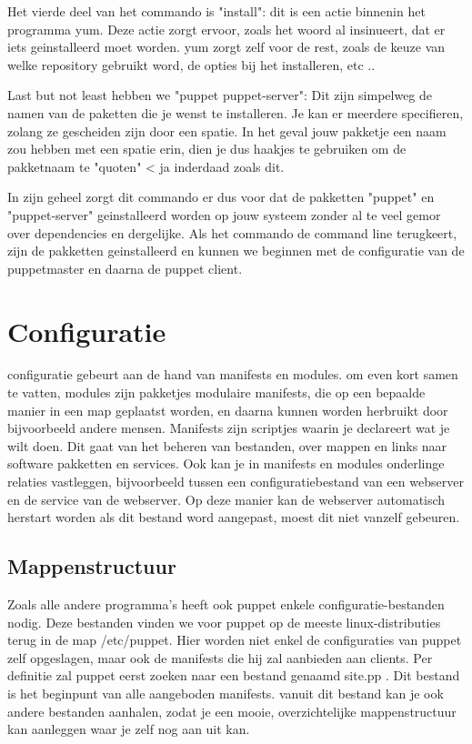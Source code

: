 Het vierde deel van het commando is "install": dit is een actie binnenin het programma yum. Deze actie zorgt ervoor, zoals het woord al insinueert, dat er iets geinstalleerd moet worden. yum zorgt zelf voor de rest, zoals de keuze van welke repository gebruikt word, de opties bij het installeren, etc ..

Last but not least hebben we "puppet puppet-server": Dit zijn simpelweg de namen van de paketten die je wenst te installeren. Je kan er meerdere specifieren, zolang ze gescheiden zijn door een spatie. In het geval jouw pakketje een naam zou hebben met een spatie erin, dien je dus haakjes te gebruiken om de pakketnaam te "quoten" < ja inderdaad zoals dit.

In zijn geheel zorgt dit commando er dus voor dat de pakketten "puppet" en "puppet-server" geinstalleerd worden op jouw systeem zonder al te veel gemor over dependencies en dergelijke. Als het commando de command line terugkeert, zijn de pakketten geinstalleerd en kunnen we beginnen met de configuratie van de puppetmaster en daarna de puppet client.


\section{Configuratie}
configuratie gebeurt aan de hand van manifests en modules. om even kort samen te vatten, modules zijn pakketjes modulaire manifests, die op een bepaalde manier in een map geplaatst worden, en daarna kunnen worden herbruikt door bijvoorbeeld andere mensen. Manifests zijn scriptjes waarin je declareert wat je wilt doen. Dit gaat van het beheren van bestanden, over mappen en links naar software pakketten en services.
Ook kan je in manifests en modules onderlinge relaties vastleggen, bijvoorbeeld tussen een configuratiebestand van een webserver en de service van de webserver. Op deze manier kan de webserver automatisch herstart worden als dit bestand word aangepast, moest dit niet vanzelf gebeuren.

\subsection{Mappenstructuur}
Zoals alle andere programma's heeft ook puppet enkele configuratie-bestanden nodig. Deze bestanden vinden we voor puppet op de meeste linux-distributies terug in de map /etc/puppet. Hier worden niet enkel de configuraties van puppet zelf opgeslagen, maar ook de manifests die hij zal aanbieden aan clients. Per definitie zal puppet eerst zoeken naar een bestand genaamd site.pp . Dit bestand is het beginpunt van alle aangeboden manifests. vanuit dit bestand kan je ook andere bestanden aanhalen, zodat je een mooie, overzichtelijke mappenstructuur kan aanleggen waar je zelf nog aan uit kan.

